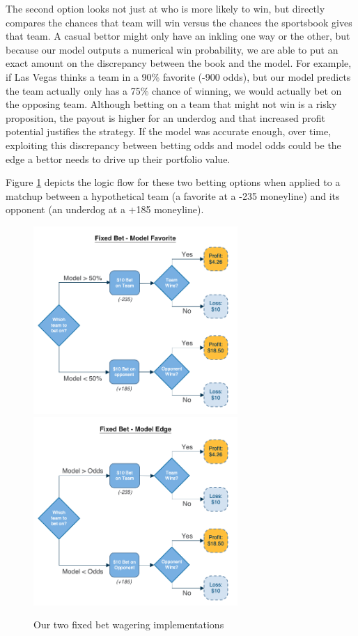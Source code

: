 \documentclass [MS] {uclathes}
\begin{document}
The second option looks not just at who is more likely to win, but directly compares the chances that team will win versus the chances the sportsbook gives that team. A casual bettor might only have an inkling one way or the other, but because our model outputs a numerical win probability, we are able to put an exact amount on the discrepancy between the book and the model. For example, if Las Vegas thinks a team in a 90\% favorite (-900 odds), but our model predicts the team actually only has a 75\% chance of winning, we would actually bet on the opposing team. Although betting on a team that might not win is a risky proposition, the payout is higher for an underdog and that increased profit potential justifies the strategy. If the model was accurate enough, over time, exploiting this discrepancy between betting odds and model odds could be the edge a bettor needs to drive up their portfolio value. 

Figure \ref{fig:fixed-bet} depicts the logic flow for these two betting options when applied to a matchup between a hypothetical team (a favorite at a -235 moneyline) and its opponent (an underdog at a +185 moneyline).

\begin{figure}%
    \centering
    {{\includegraphics[width=7.75cm]{fixed-bets-fav.png} }}%
    \qquad
    {{\includegraphics[width=7.75cm]{fixed-bets-edge.png} }}%
    \caption{Our two fixed bet wagering implementations}%
    \label{fig:fixed-bet}%
\end{figure}
\end{document}
